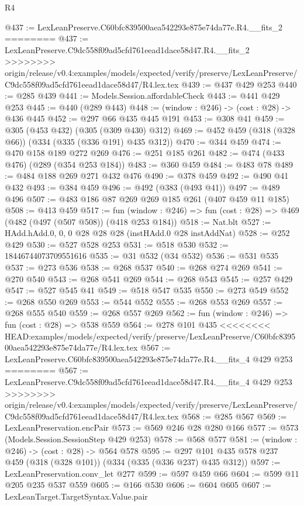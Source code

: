 \begin{lexlean}{R4}
\begin{coremodule}
{{{{{{{{{{{{{{@437 := LexLeanPreserve.C60bfc839500aea542293e875e74da77e.R4.__fits_2
========
@437 := LexLeanPreserve.C9dc558f09ad5cfd761eead1dace58d47.R4.__fits_2
>>>>>>>> origin/release/v0.4:examples/models/expected/verify/preserve/LexLeanPreserve/C9dc558f09ad5cfd761eead1dace58d47/R4.lex.tex
@439 := @437 @429 @253
@440 := @285 @439
@441 := Models.Session.affordableCheck
@443 := @441 @429 @253
@445 := @440 (@289 @443)
@448 := (window : @246) -> (cost : @28) -> @436 @445
@452 := @297 @66 @435 @445 @191
@453 := @308 @41
@459 := @305 (@453 @432) (@305 (@309 @430) @312)
@469 := @452 @459 (@318 (@328 @66)) (@334 (@335 (@336 @191) @435 @312))
@470 := @344 @459
@474 := @470 @158 @189 @272 @269
@476 := @251 @185 @261
@482 := @474 (@433 @476) (@289 (@354 @253 @184))
@483 := @360 @459
@484 := @483 @78
@489 := @484 @188 @269 @271 @432 @476
@490 := @378 @459
@492 := @490 @41 @432
@493 := @384 @459
@496 := @492 (@383 (@493 @41))
@497 := @489 @496
@507 := @483 @186 @87 @269 @269 @185 @261 (@407 @459 @11 @185)
@508 := @413 @459
@517 := fun (window : @246) => fun (cost : @28) => @469 (@482 (@497 (@507 @508)) (@418 @253 @184))
@518 := Nat.blt
@527 := HAdd.hAdd.{0, 0, 0} @28 @28 @28 (instHAdd.{0} @28 instAddNat)
@528 := @252 @429
@530 := @527 @528 @253
@531 := @518 @530
@532 := 18446744073709551616
@535 := @31 @532 (@34 @532)
@536 := @531 @535
@537 := @273 @536
@538 := @268 @537
@540 := @268 @274 @269
@541 := @270 @540
@543 := @268 @541 @269
@544 := @268 @543
@545 := @257 @429
@547 := @527 @545 @41
@549 := @518 @547 @535
@550 := @273 @549
@552 := @268 @550 @269
@553 := @544 @552
@555 := @268 @553 @269
@557 := @268 @555 @540
@559 := @268 @557 @269
@562 := fun (window : @246) => fun (cost : @28) => @538 @559
@564 := @278 @101 @435
<<<<<<<< HEAD:examples/models/expected/verify/preserve/LexLeanPreserve/C60bfc839500aea542293e875e74da77e/R4.lex.tex
@567 := LexLeanPreserve.C60bfc839500aea542293e875e74da77e.R4.__fits_4 @429 @253
========
@567 := LexLeanPreserve.C9dc558f09ad5cfd761eead1dace58d47.R4.__fits_4 @429 @253
>>>>>>>> origin/release/v0.4:examples/models/expected/verify/preserve/LexLeanPreserve/C9dc558f09ad5cfd761eead1dace58d47/R4.lex.tex
@568 := @285 @567
@569 := LexLeanPreservation.encPair
@573 := @569 @246 @28 @280 @166
@577 := @573 (Models.Session.SessionStep @429 @253)
@578 := @568 @577
@581 := (window : @246) -> (cost : @28) -> @564 @578
@595 := @297 @101 @435 @578 @237 @459 (@318 (@328 @101)) (@334 (@335 (@336 @237) @435 @312))
@597 := LexLeanPreservation.conv_let @277
@599 := @597 @459 @66
@604 := @599 @11 @205 @235 @537 @559
@605 := @166 @530
@606 := @604 @605
@607 := LexLeanTarget.TargetSyntax.Value.pair
}}}}}}}}}}}}}}
\end{coremodule}
\end{lexlean}
